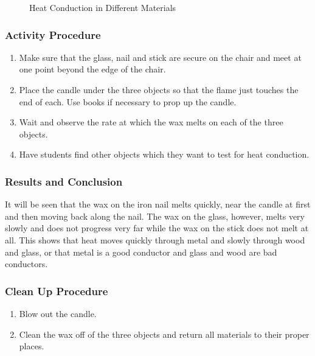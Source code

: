 \begin{figure}
\begin{center}
\def\svgwidth{150pt}

\caption{Heat Conduction in Different Materials}
\label{fig:heat-conduction}
\end{center}
\end{figure}

\subsubsection*{Activity Procedure}
\begin{enumerate}
\item{Make sure that the glass, nail and stick are secure on the chair and meet at one point beyond the edge of the chair.} 
\item{Place the candle under the three objects so that the flame just touches the end of each. Use books if necessary to prop up the candle.} 
\item{Wait and observe the rate at which the wax melts on each of the three objects.} 
\item{Have students find other objects which they want to test for heat conduction.} 
\end{enumerate}

\subsubsection*{Results and Conclusion}
It will be seen that the wax on the iron nail melts quickly, near the candle at first and then moving back along the nail. The wax on the glass, however, melts very slowly and does not progress very far while the wax on the stick does not melt at all.  
This shows that heat moves quickly through metal and slowly through wood and glass, or that metal is a good conductor and glass and wood are bad conductors.  

\subsubsection*{Clean Up Procedure}
\begin{enumerate}
\item{Blow out the candle.} 
\item{Clean the wax off of the three objects and return all materials to their proper places.} 
\end{enumerate}

